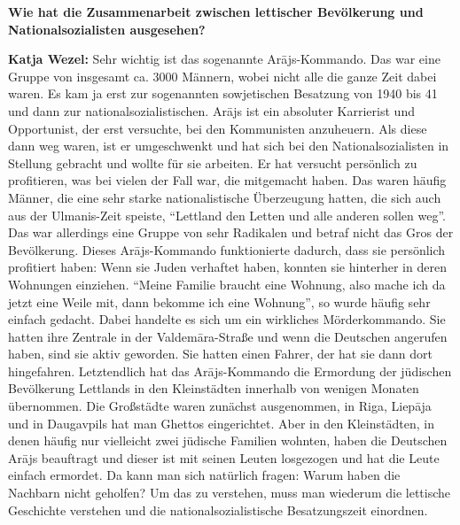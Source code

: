 \textbf{Wie hat die Zusammenarbeit zwischen lettischer Bevölkerung und Nationalsozialisten ausgesehen?} 

\textbf{Katja Wezel:} Sehr wichtig ist das sogenannte Arājs-Kommando. Das war eine Gruppe von insgesamt ca. 3000 Männern, wobei nicht alle die ganze Zeit dabei waren. Es kam ja erst zur sogenannten sowjetischen Besatzung von 1940 bis 41 und dann zur nationalsozialistischen. Arājs ist ein absoluter Karrierist und Opportunist, der erst versuchte, bei den Kommunisten anzuheuern. Als diese dann weg waren, ist er umgeschwenkt und hat sich bei den Nationalsozialisten in Stellung gebracht und wollte für sie arbeiten. Er hat versucht persönlich zu profitieren, was bei vielen der Fall war, die mitgemacht haben. Das waren häufig Männer, die eine sehr starke nationalistische Überzeugung hatten, die sich auch aus der Ulmanis-Zeit speiste, ``Lettland den Letten und alle anderen sollen weg''. Das war allerdings eine Gruppe von sehr Radikalen und betraf nicht das Gros der Bevölkerung. Dieses Arājs-Kommando funktionierte dadurch, dass sie persönlich profitiert haben: Wenn sie Juden verhaftet haben, konnten sie hinterher in deren Wohnungen einziehen. ``Meine Familie braucht eine Wohnung, also mache ich da jetzt eine Weile mit, dann bekomme ich eine Wohnung'', so wurde häufig sehr einfach gedacht. Dabei handelte es sich um ein wirkliches Mörderkommando. Sie hatten ihre Zentrale in der Valdemāra-Straße und wenn die Deutschen angerufen haben, sind sie aktiv geworden. Sie hatten einen Fahrer, der hat sie dann dort hingefahren. Letztendlich hat das Arājs-Kommando die Ermordung der jüdischen Bevölkerung Lettlands in den Kleinstädten innerhalb von wenigen Monaten übernommen. Die Großstädte waren zunächst ausgenommen, in Riga, Liepāja und in Daugavpils hat man Ghettos eingerichtet. Aber in den Kleinstädten, in denen häufig nur vielleicht zwei jüdische Familien wohnten, haben die Deutschen Arājs beauftragt und dieser ist mit seinen Leuten losgezogen und hat die Leute einfach ermordet. Da kann man sich natürlich fragen: Warum haben die Nachbarn nicht geholfen? Um das zu verstehen, muss man wiederum die lettische Geschichte verstehen und die nationalsozialistische Besatzungszeit einordnen.\\
